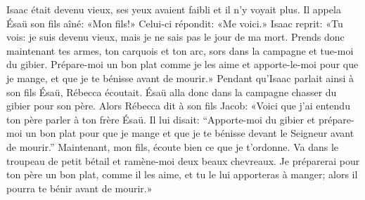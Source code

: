 Isaac était devenu vieux, ses yeux avaient faibli et il n’y voyait plus.
Il appela Ésaü son fils aîné: «Mon fils!»
	Celui-ci répondit: «Me voici.»
Isaac reprit: «Tu vois: je suis devenu vieux, mais je ne sais pas le jour de ma mort.
Prends donc maintenant tes armes, ton carquois et ton arc,
	sors dans la campagne et tue-moi du gibier.
Prépare-moi un bon plat comme je les aime et apporte-le-moi pour que je mange,
	et que je te bénisse avant de mourir.»
Pendant qu’Isaac parlait ainsi à son fils Ésaü, Rébecca écoutait.
Ésaü alla donc dans la campagne chasser du gibier pour son père.
Alors Rébecca dit à son fils Jacob:
	«Voici que j’ai entendu ton père parler à ton frère Ésaü.
Il lui disait: “Apporte-moi du gibier et prépare-moi un bon plat
	pour que je mange et que je te bénisse devant le Seigneur avant de mourir.”
Maintenant, mon fils, écoute bien ce que je t’ordonne.
Va dans le troupeau de petit bétail et ramène-moi deux beaux chevreaux.
Je préparerai pour ton père un bon plat, comme il les aime,
	et tu le lui apporteras à manger;
	alors il pourra te bénir avant de mourir.»
